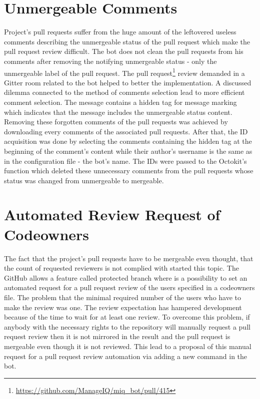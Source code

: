 \section{Unmergeable Comments}

Project's pull requests suffer from the huge amount of the leftovered useless comments describing the unmergeable status of the pull request which make the pull request review difficult. The bot does not clean the pull requests from his comments after removing the notifying unmergeable status - only the unmergeable label of the pull request. The pull request\footnote{\url{https://github.com/ManageIQ/miq_bot/pull/415}} review demanded in a Gitter room related to the bot helped to better the implementation. A discussed dilemma connected to the method of comments selection lead to more efficient comment selection. The message contains a hidden tag for message marking which indicates that the message includes the unmergeable status content.\\

Removing these forgotten comments of the pull requests was achieved by downloading every comments of the associated pull requests. After that, the ID acquisition was done by selecting the comments containing the hidden tag at the beginning of the comment's content while their author's username is the same as in the configuration file - the bot's name. The IDs were passed to the Octokit's function which deleted these unnecessary comments from the pull requests whose status was changed from unmergeable to mergeable.

\section{Automated Review Request of Codeowners}

The fact that the project's pull requests have to be mergeable even thought, that the count of requested reviewers is not complied with started this topic. The GitHub allows a feature called protected branch where is a possibility to set an automated request for a pull request review of the users specified in a codeowners file. The problem that the minimal required number of the users who have to make the review was one. The review expectation has hampered development because of the time to wait for at least one review. To overcome this problem, if anybody with the necessary rights to the repository will manually request a pull request review then it is not mirrored in the result and the pull request is mergeable even though it is not reviewed. This lead to a proposal of this manual request for a pull request review automation via adding a new command in the bot.

